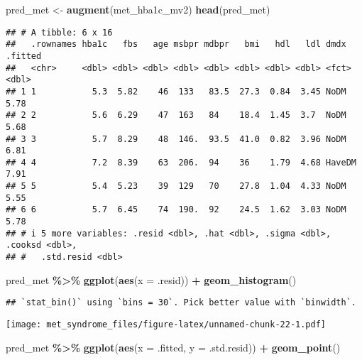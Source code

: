 \documentclass[
]{article}
\newenvironment{Shaded}{\begin{snugshade}}{\end{snugshade}}
\newcommand{\AttributeTok}[1]{\textcolor[rgb]{0.13,0.29,0.53}{#1}}
\newcommand{\FunctionTok}[1]{\textcolor[rgb]{0.13,0.29,0.53}{\textbf{#1}}}
\newcommand{\NormalTok}[1]{#1}
\newcommand{\OtherTok}[1]{\textcolor[rgb]{0.56,0.35,0.01}{#1}}
\newcommand{\SpecialCharTok}[1]{\textcolor[rgb]{0.81,0.36,0.00}{\textbf{#1}}}
\begin{document}
\begin{Shaded}
\begin{Highlighting}[]
\NormalTok{pred\_met }\OtherTok{\textless{}{-}} \FunctionTok{augment}\NormalTok{(met\_hba1c\_mv2)}
\FunctionTok{head}\NormalTok{(pred\_met)}
\end{Highlighting}
\end{Shaded}

\begin{verbatim}
## # A tibble: 6 x 16
##   .rownames hba1c   fbs   age msbpr mdbpr   bmi   hdl   ldl dmdx   .fitted
##   <chr>     <dbl> <dbl> <dbl> <dbl> <dbl> <dbl> <dbl> <dbl> <fct>    <dbl>
## 1 1           5.3  5.82    46  133   83.5  27.3  0.84  3.45 NoDM      5.78
## 2 2           5.6  6.29    47  163   84    18.4  1.45  3.7  NoDM      5.68
## 3 3           5.7  8.29    48  146.  93.5  41.0  0.82  3.96 NoDM      6.81
## 4 4           7.2  8.39    63  206.  94    36    1.79  4.68 HaveDM    7.91
## 5 5           5.4  5.23    39  129   70    27.8  1.04  4.33 NoDM      5.55
## 6 6           5.7  6.45    74  190.  92    24.5  1.62  3.03 NoDM      5.78
## # i 5 more variables: .resid <dbl>, .hat <dbl>, .sigma <dbl>, .cooksd <dbl>,
## #   .std.resid <dbl>
\end{verbatim}

\begin{Shaded}
\begin{Highlighting}[]
\NormalTok{pred\_met }\SpecialCharTok{\%\textgreater{}\%} 
  \FunctionTok{ggplot}\NormalTok{(}\FunctionTok{aes}\NormalTok{(}\AttributeTok{x =}\NormalTok{ .resid)) }\SpecialCharTok{+}
  \FunctionTok{geom\_histogram}\NormalTok{()}
\end{Highlighting}
\end{Shaded}

\begin{verbatim}
## `stat_bin()` using `bins = 30`. Pick better value with `binwidth`.
\end{verbatim}

\texttt{[image: met\_syndrome\_files/figure-latex/unnamed-chunk-22-1.pdf]}

\begin{Shaded}
\begin{Highlighting}[]
\NormalTok{pred\_met }\SpecialCharTok{\%\textgreater{}\%} 
  \FunctionTok{ggplot}\NormalTok{(}\FunctionTok{aes}\NormalTok{(}\AttributeTok{x =}\NormalTok{ .fitted, }\AttributeTok{y =}\NormalTok{ .std.resid)) }\SpecialCharTok{+}
  \FunctionTok{geom\_point}\NormalTok{()}
\end{Highlighting}
\end{Shaded}
\end{document}
